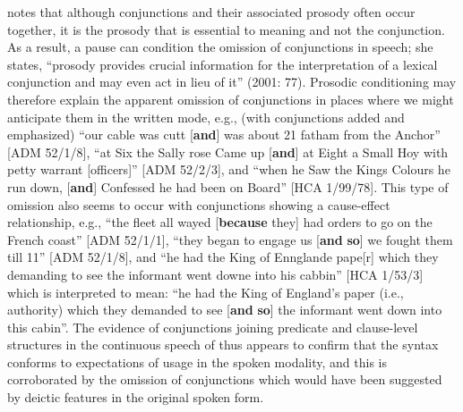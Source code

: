 \citeauthor{Wennerstrom2001} notes that although conjunctions and their associated prosody often occur together, it is the prosody that is essential to meaning and not the conjunction. As a result, a pause can condition the omission of conjunctions in speech; she states, “prosody provides crucial information for the interpretation of a lexical conjunction and may even act in lieu of it” (2001: 77). Prosodic conditioning may therefore explain the apparent omission of conjunctions in places where we might anticipate them in the written mode, e.g., (with conjunctions added and emphasized) “our cable was cutt [\textbf{and}] was about 21 fatham from the Anchor” [ADM 52/1/8], “at Six the Sally rose Came up [\textbf{and}] at Eight a Small Hoy with petty warrant [officers]” [ADM 52/2/3], and  “when he Saw the Kings Colours he run down, [\textbf{and}] Confessed he had been on Board” [HCA 1/99/78]. This type of omission also seems to occur with conjunctions showing a cause-effect relationship, e.g., “the fleet all wayed [\textbf{because} they] had orders to go on the French coast” [ADM 52/1/1], “they began to engage us [\textbf{and} \textbf{so}] we fought them till 11” [ADM 52/1/8], and “he had the King of Ennglande pape[r] which they demanding to see the informant went downe into his cabbin” [HCA 1/53/3] which is interpreted to mean: “he had the King of England’s paper (i.e., authority) which they demanded to see [\textbf{and} \textbf{so}] the informant went down into this cabin”. The evidence of conjunctions joining predicate and clause-level structures in the continuous speech of  thus appears to confirm that the syntax conforms to expectations of usage in the spoken modality, and this is corroborated by the omission of conjunctions which would have been suggested by deictic features in the original spoken form. 

